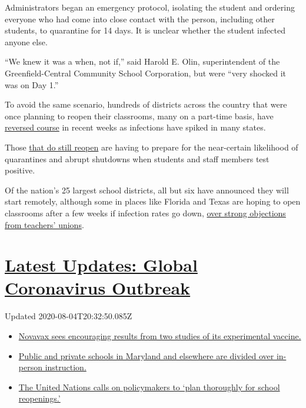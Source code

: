 Administrators began an emergency protocol, isolating the student and
ordering everyone who had come into close contact with the person,
including other students, to quarantine for 14 days. It is unclear
whether the student infected anyone else.

``We knew it was a when, not if,'' said Harold E. Olin, superintendent
of the Greenfield-Central Community School Corporation, but were ``very
shocked it was on Day 1.''

To avoid the same scenario, hundreds of districts across the country
that were once planning to reopen their classrooms, many on a part-time
basis, have
\href{https://www.nytimes.com/2020/07/13/us/lausd-san-diego-school-reopening.html}{reversed
course} in recent weeks as infections have spiked in many states.

Those
\href{https://www.nytimes.com/2020/07/14/us/coronavirus-schools-fall.html}{that
do still reopen} are having to prepare for the near-certain likelihood
of quarantines and abrupt shutdowns when students and staff members test
positive.

Of the nation's 25 largest school districts, all but six have announced
they will start remotely, although some in places like Florida and Texas
are hoping to open classrooms after a few weeks if infection rates go
down,
\href{https://www.nytimes.com/2020/07/29/us/teacher-union-school-reopening-coronavirus.html}{over
strong objections from teachers' unions}.

\hypertarget{latest-updates-global-coronavirus-outbreak}{%
\section{\texorpdfstring{\href{https://www.nytimes.com/2020/08/04/world/coronavirus-cases.html?action=click\&pgtype=Article\&state=default\&region=MAIN_CONTENT_1\&context=storylines_live_updates}{Latest
Updates: Global Coronavirus
Outbreak}}{Latest Updates: Global Coronavirus Outbreak}}\label{latest-updates-global-coronavirus-outbreak}}

Updated 2020-08-04T20:32:50.085Z

\begin{itemize}
\tightlist
\item
  \href{https://www.nytimes.com/2020/08/04/world/coronavirus-cases.html?action=click\&pgtype=Article\&state=default\&region=MAIN_CONTENT_1\&context=storylines_live_updates\#link-1228a480}{Novavax
  sees encouraging results from two studies of its experimental
  vaccine.}
\item
  \href{https://www.nytimes.com/2020/08/04/world/coronavirus-cases.html?action=click\&pgtype=Article\&state=default\&region=MAIN_CONTENT_1\&context=storylines_live_updates\#link-4825b93}{Public
  and private schools in Maryland and elsewhere are divided over
  in-person instruction.}
\item
  \href{https://www.nytimes.com/2020/08/04/world/coronavirus-cases.html?action=click\&pgtype=Article\&state=default\&region=MAIN_CONTENT_1\&context=storylines_live_updates\#link-50f7386d}{The
  United Nations calls on policymakers to `plan thoroughly for school
  reopenings.'}
\end{itemize}

